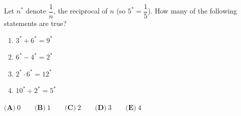 Let $n^*$ denote $\dfrac1n$, the reciprocal of $n$ (so $5^*=\dfrac15$). How many of the following statements are true?
\begin{enumerate}
\item[i)] $3^*+6^*=9^*$ \item[ii)] $6^*-4^*=2^*$ \item[iii)] $2^*\cdot6^*=12^*$ \item[iv)] $10^*\div2^*=5^*$
\end{enumerate}
$\textbf{(A)}\ 0\qquad\textbf{(B)}\ 1\qquad\textbf{(C)}\ 2\qquad\textbf{(D)}\ 3\qquad\textbf{(E)}\ 4$
